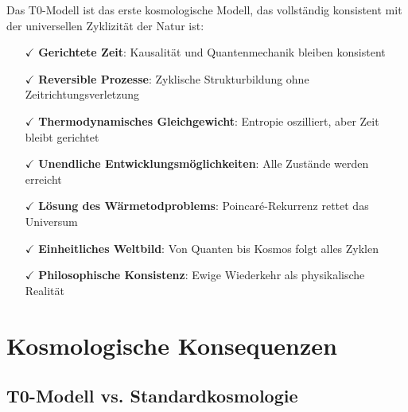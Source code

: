 \documentclass[12pt,a4paper]{article}
\theoremstyle{definition}
\begin{document}
	\begin{revolutionary}
		Das T0-Modell ist das erste kosmologische Modell, das vollständig konsistent mit der universellen Zyklizität der Natur ist:
		\begin{itemize}
			\item[$\checkmark$] \textbf{Gerichtete Zeit}: Kausalität und Quantenmechanik bleiben konsistent
			\item[$\checkmark$] \textbf{Reversible Prozesse}: Zyklische Strukturbildung ohne Zeitrichtungsverletzung  
			\item[$\checkmark$] \textbf{Thermodynamisches Gleichgewicht}: Entropie oszilliert, aber Zeit bleibt gerichtet
			\item[$\checkmark$] \textbf{Unendliche Entwicklungsmöglichkeiten}: Alle Zustände werden erreicht
			\item[$\checkmark$] \textbf{Lösung des Wärmetodproblems}: Poincaré-Rekurrenz rettet das Universum
			\item[$\checkmark$] \textbf{Einheitliches Weltbild}: Von Quanten bis Kosmos folgt alles Zyklen
			\item[$\checkmark$] \textbf{Philosophische Konsistenz}: Ewige Wiederkehr als physikalische Realität
		\end{itemize}
	\end{revolutionary}
	
	\section{Kosmologische Konsequenzen}
	
	\subsection{T0-Modell vs. Standardkosmologie}
	
\end{document}
